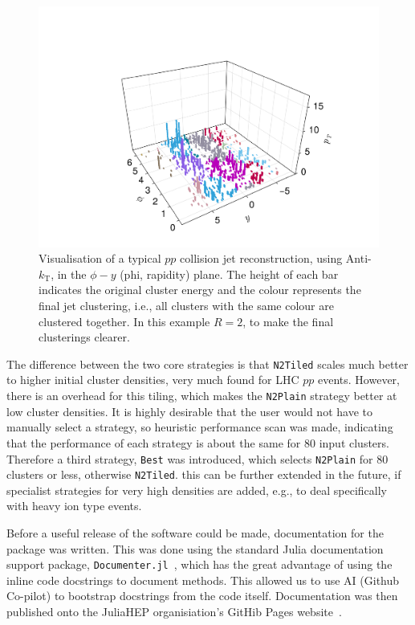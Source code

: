 \documentclass{webofc}
\newcommand{\Akt}{Anti-${k}_\text{T}$}
\begin{document}
\begin{figure}[h]
    \begin{center}
        \includegraphics[width=0.8\linewidth]{jetvis-5-compact.pdf}
        \caption{Visualisation of a typical $pp$ collision jet reconstruction, using \Akt, in the $\phi-y$ (phi, rapidity) plane. The height of each bar indicates the original cluster energy and the colour represents the final jet clustering, i.e., all clusters with the same colour are clustered together. In this example $R=2$, to make the final clusterings clearer.}
        \label{fig:jetvisplot}
    \end{center}
\end{figure}

The difference between the two core strategies is that \texttt{N2Tiled} scales
much better to higher initial cluster densities, very much found for LHC $pp$
events. However, there is an overhead for this tiling, which makes the
\texttt{N2Plain} strategy better at low cluster densities. It is highly
desirable that the user would not have to manually select a strategy, so
heuristic performance scan was made, indicating that the performance of each
strategy is about the same for 80 input clusters. Therefore a third strategy,
\texttt{Best} was introduced, which selects \texttt{N2Plain} for 80 clusters or
less, otherwise \texttt{N2Tiled}. this can be further extended in the future, if
specialist strategies for very high densities are added, e.g., to deal
specifically with heavy ion type events.

Before a useful release of the software could be made, documentation for the
package was written. This was done using the standard Julia documentation
support package, \texttt{Documenter.jl}~\cite{documenter-jl}, which has the
great advantage of using the inline code docstrings to document methods. This
allowed us to use AI (Github Co-pilot) to bootstrap docstrings from the code
itself. Documentation was then published onto the JuliaHEP organisiation's
GitHib Pages website~\cite{jetreco-docs}.
\end{document}
